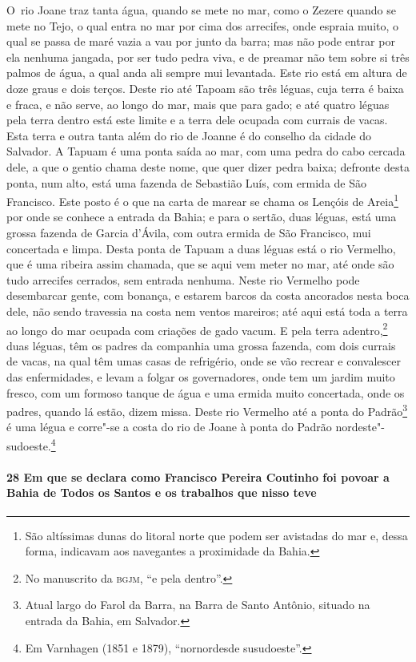 \mbox{O rio} Joane traz tanta água, quando se mete no mar, como o Zezere quando se mete no Tejo,
o qual entra no mar por cima dos arrecifes, onde espraia muito, o qual se passa de maré
vazia a vau por junto da barra; mas não pode entrar por ela nenhuma jangada, por ser tudo
pedra viva, e de preamar não tem sobre si três palmos de água, a qual anda ali sempre mui
levantada. Este rio está em altura de doze graus e dois terços. Deste rio até Tapoam são
três léguas, cuja terra é baixa e fraca, e não serve, ao longo do mar, mais que para gado;
e até quatro léguas pela terra dentro está este limite e a terra dele ocupada com currais
de vacas. Esta terra e outra tanta além do rio de Joanne é do conselho da cidade do
Salvador. A Tapuam é uma ponta saída ao mar, com uma pedra do cabo cercada dele, a que o
gentio chama deste nome, que quer dizer pedra baixa; defronte desta ponta, num alto, está
uma fazenda de Sebastião Luís, com ermida de São Francisco. Este posto é o que na carta de
marear se chama os Lençóis de Areia\footnote{ São altíssimas dunas do litoral norte que
podem ser avistadas do mar e, dessa forma, indicavam aos navegantes a proximidade da
Bahia.} por onde se conhece a entrada da Bahia; e para o sertão, duas léguas, está uma
grossa fazenda de Garcia d'Ávila, com outra ermida de São Francisco, mui concertada e
limpa. Desta ponta de Tapuam a duas léguas está o rio Vermelho, que é uma ribeira assim
chamada, que se aqui vem meter no mar, até onde são tudo arrecifes cerrados, sem entrada
nenhuma. Neste rio Vermelho pode desembarcar gente, com bonança, e estarem barcos da costa
ancorados nesta boca dele, não sendo travessia na costa nem ventos mareiros; até aqui está
toda a terra ao longo do mar ocupada com criações de gado vacum. E pela terra
adentro,\footnote{ No manuscrito da \textsc{bgjm}, ``e pela dentro''.} duas léguas, têm os
padres da companhia uma grossa fazenda, com dois currais de vacas, na qual têm umas casas
de refrigério, onde se vão recrear e convalescer das enfermidades, e levam a folgar os
governadores, onde tem um jardim muito fresco, com um formoso tanque de água e uma ermida
muito concertada, onde os padres, quando lá estão, dizem missa. Deste rio Vermelho até a
ponta do Padrão\footnote{ Atual largo do Farol da Barra, na Barra de Santo Antônio,
situado na entrada da Bahia, em Salvador.} é uma légua e corre"-se a costa do rio de Joane
à ponta do Padrão nordeste"-sudoeste.\footnote{ Em Varnhagen (1851 e 1879), ``nornordesde
susudoeste''.}

\paragraph{28 Em que se declara como Francisco Pereira Coutinho foi povoar a Bahia de
Todos os Santos e os trabalhos que nisso teve}


